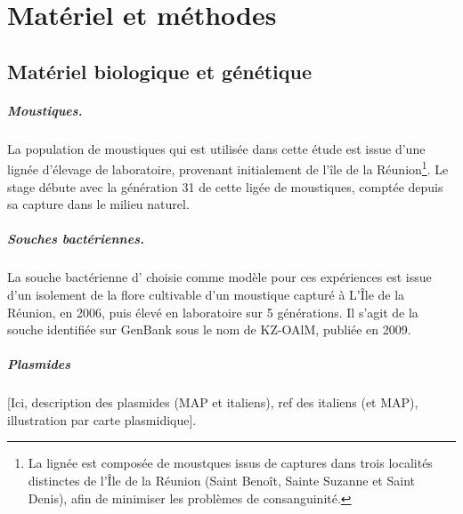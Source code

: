 \chapter{Matériel et méthodes}

\section{Matériel biologique et génétique}

\paragraph{Moustiques.}
\label{par:moustiques}
La population de moustiques  qui est utilisée dans cette étude est issue d'une lignée d'élevage de laboratoire, provenant initialement de l'île de la Réunion\footnote{La lignée est composée de moustques issus de captures dans trois localités distinctes de l'Île de la Réunion (Saint Benoît, Sainte Suzanne et Saint Denis), afin de minimiser les problèmes de consanguinité.}.
Le stage débute avec la génération 31 de cette ligée de moustiques, comptée depuis sa capture dans le milieu naturel.

\paragraph{Souches bactériennes.}
La souche bactérienne d' choisie comme modèle pour ces expériences est issue d'un isolement de la flore cultivable d'un moustique capturé à L'Île de la Réunion, en 2006, puis élevé en laboratoire sur 5 générations.
Il s'agit de la souche identifiée sur GenBank sous le nom de KZ-OAlM, publiée en 2009\cite{zouache2009}.

\paragraph{Plasmides}
[Ici, description des plasmides (MAP et italiens), ref des italiens (et MAP), illustration par carte plasmidique].


